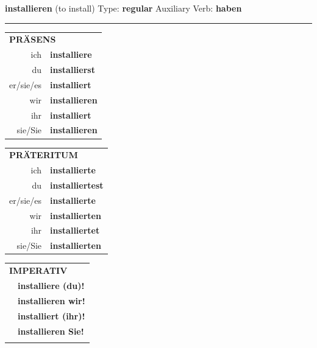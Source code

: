 \documentclass[10pt,a4paper]{revtex4-2}
\begin{document}
\begin{verbbox}
    {\Large \bf installieren} (to install) \hfill Type: \textbf{regular} \hfill Auxiliary Verb: \textbf{haben} 
    
     \vspace{5pt}

    \hrule
    
    \vspace{5pt}

  \begin{tabular}{rl}
     \multicolumn{2}{l}{\textbf{PRÄSENS} }\\
    ich & \textbf{installiere}\\
    du & \textbf{installierst}\\
    er/sie/es & \textbf{installiert}\\
    wir & \textbf{installieren}\\
    ihr & \textbf{installiert}\\
    sie/Sie & \textbf{installieren}\\
  \end{tabular}
  \hfill
  \begin{tabular}{rl}
    \multicolumn{2}{l}{\textbf{PRÄTERITUM} }\\
    ich & \textbf{installierte}\\
    du & \textbf{installiertest}\\
    er/sie/es & \textbf{installierte}\\
    wir & \textbf{installierten}\\
    ihr & \textbf{installiertet}\\
    sie/Sie & \textbf{installierten}\\
  \end{tabular}
  \hfill
  \begin{tabular}{rl}
     \multicolumn{2}{l}{\textbf{IMPERATIV} }\\
   & \textbf{installiere (du)!}\\
   & \textbf{installieren wir!}\\
   & \textbf{installiert (ihr)!}\\
   & \textbf{installieren Sie!}\\
   & \vspace{10pt}
  \end{tabular}

 \vspace{10pt}


\end{verbbox}
\end{document}
